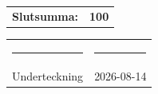 \documentclass[a4paper,11pt]{article}
\begin{document}
\vspace{0.8cm}


\begin{flushright}

\begin{tabular}{lr}
    \textbf{Slutsumma:} & \textbf{100}
\end{tabular}

\end{flushright}

\vfill


\begin{center}

\begin{tabular}{p{6cm} p{6cm}}
    \rule{6cm}{0.4pt} &
    \rule{6cm}{0.4pt} \\[0.15cm]
    Underteckning &
    2026-08-14
\end{tabular}

\end{center}
\end{document}
